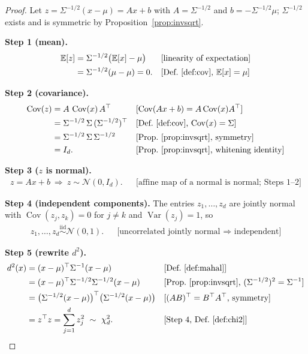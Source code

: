 \documentclass[11pt]{article}
\theoremstyle{definition}
\newcommand{\T}{^{\top}}
\newcommand{\E}{\mathbb{E}}
\newcommand{\Cov}{\operatorname{Cov}}
\newcommand{\Var}{\operatorname{Var}}
\newcommand{\rul}[1]{\text{[#1]}}
\begin{document}
\begin{proof}
Let $z=\Sigma^{-1/2}(x-\mu)=Ax+b$ with $A=\Sigma^{-1/2}$ and $b=-\Sigma^{-1/2}\mu$; $\Sigma^{-1/2}$ exists and is symmetric by Proposition~\ref{prop:invsqrt}.

\textbf{Step 1 (mean).}
\begin{align*}
\E[z] &= \Sigma^{-1/2}\big(\E[x]-\mu\big) && \rul{linearity of expectation}\\
&= \Sigma^{-1/2}(\mu-\mu)=0. && \rul{Def.~\ref{def:cov}, $\E[x]=\mu$}
\end{align*}

\textbf{Step 2 (covariance).}
\begin{align*}
\Cov(z) &= A\,\Cov(x)\,A\T && \rul{$\Cov(Ax+b)=A\Cov(x)A\T$}\\
&= \Sigma^{-1/2}\,\Sigma\,(\Sigma^{-1/2})\T && \rul{Def.~\ref{def:cov}, $\Cov(x)=\Sigma$}\\
&= \Sigma^{-1/2}\,\Sigma\,\Sigma^{-1/2} && \rul{Prop.~\ref{prop:invsqrt}, symmetry}\\
&= I_d. && \rul{Prop.~\ref{prop:invsqrt}, whitening identity}
\end{align*}

\textbf{Step 3 ($z$ is normal).}
\begin{align*}
z=Ax+b\ \Longrightarrow\ z\sim\mathcal N(0,I_d). && \rul{affine map of a normal is normal; Steps 1--2}
\end{align*}

\textbf{Step 4 (independent components).} The entries $z_1,\dots,z_d$ are jointly normal with $\Cov(z_j,z_k)=0$ for $j\neq k$ and $\Var(z_j)=1$, so
\begin{align*}
z_1,\dots,z_d\overset{\text{iid}}{\sim}\mathcal N(0,1). && \rul{uncorrelated jointly normal $\Rightarrow$ independent}
\end{align*}

\textbf{Step 5 (rewrite $d^2$).}
\begin{align*}
d^2(x) &= (x-\mu)\T\Sigma^{-1}(x-\mu) && \rul{Def.~\ref{def:mahal}}\\
&= (x-\mu)\T\Sigma^{-1/2}\Sigma^{-1/2}(x-\mu) && \rul{Prop.~\ref{prop:invsqrt}, $(\Sigma^{-1/2})^2=\Sigma^{-1}$}\\
&= \big(\Sigma^{-1/2}(x-\mu)\big)\T\big(\Sigma^{-1/2}(x-\mu)\big) && \rul{$(AB)\T=B\T A\T$, symmetry}\\
&= z\T z=\sum_{j=1}^d z_j^2\ \sim\ \chi^2_d. && \rul{Step 4, Def.~\ref{def:chi2}}
\end{align*}
\end{proof}
\end{document}
